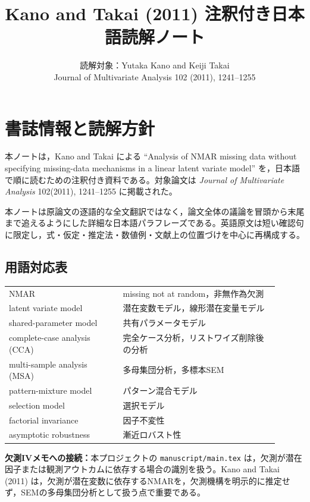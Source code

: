\documentclass[dvipdfmx,autodetect-engine]{jsarticle}
\title{Kano and Takai (2011) 注釈付き日本語読解ノート}
\author{読解対象：Yutaka Kano and Keiji Takai\\
\small Journal of Multivariate Analysis 102 (2011), 1241--1255}
\date{}
\newcommand{\connect}[1]{\par\smallskip\noindent\textbf{欠測IVメモへの接続：}#1\par\smallskip}
\begin{document}
\maketitle

\section*{書誌情報と読解方針}

本ノートは，Kano and Takai による ``Analysis of NMAR missing data without specifying missing-data mechanisms in a linear latent variate model'' を，日本語で順に読むための注釈付き資料である。対象論文は \textit{Journal of Multivariate Analysis} 102(2011), 1241--1255 に掲載された。

本ノートは原論文の逐語的な全文翻訳ではなく，論文全体の議論を冒頭から末尾まで追えるようにした詳細な日本語パラフレーズである。英語原文は短い確認句に限定し，式・仮定・推定法・数値例・文献上の位置づけを中心に再構成する。

\subsection*{用語対応表}

\begin{center}
\begin{tabular}{p{0.38\linewidth}p{0.52\linewidth}}
NMAR & missing not at random，非無作為欠測 \\
latent variate model & 潜在変数モデル，線形潜在変量モデル \\
shared-parameter model & 共有パラメータモデル \\
complete-case analysis (CCA) & 完全ケース分析，リストワイズ削除後の分析 \\
multi-sample analysis (MSA) & 多母集団分析，多標本SEM \\
pattern-mixture model & パターン混合モデル \\
selection model & 選択モデル \\
factorial invariance & 因子不変性 \\
asymptotic robustness & 漸近ロバスト性 \\
\end{tabular}
\end{center}

\connect{本プロジェクトの \texttt{manuscript/main.tex} は，欠測が潜在因子または観測アウトカムに依存する場合の識別を扱う。Kano and Takai (2011) は，欠測が潜在変数に依存するNMARを，欠測機構を明示的に推定せず，SEMの多母集団分析として扱う点で重要である。}
\end{document}
